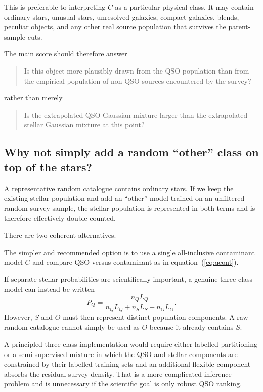 \documentclass[11pt]{article}
\begin{document}
This is preferable to interpreting $C$ as a particular physical class. It may
contain ordinary stars, unusual stars, unresolved galaxies, compact galaxies,
blends, peculiar objects, and any other real source population that survives
the parent-sample cuts.

The main score should therefore answer
%
\begin{quote}
Is this object more plausibly drawn from the QSO population than from the
empirical population of non-QSO sources encountered by the survey?
\end{quote}
%
rather than merely
%
\begin{quote}
Is the extrapolated QSO Gaussian mixture larger than the extrapolated stellar
Gaussian mixture at this point?
\end{quote}

\subsection{Why not simply add a random ``other'' class on top of the stars?}

A representative random catalogue contains ordinary stars. If we keep the
existing stellar population and add an ``other'' model trained on an
unfiltered random survey sample, the stellar population is represented in both
terms and is therefore effectively double-counted.

There are two coherent alternatives.

The simpler and recommended option is to use a single all-inclusive
contaminant model $C$ and compare QSO versus contaminant as in
equation~(\ref{eq:qcont}).

If separate stellar probabilities are scientifically important, a genuine
three-class model can instead be written
%
\begin{equation}
P_Q
=
\frac{
n_Q L_Q
}{
n_Q L_Q+n_S L_S+n_O L_O
}.
\label{eq:threeclass}
\end{equation}
%
However, $S$ and $O$ must then represent distinct population components.
A raw random catalogue cannot simply be used as $O$ because it already
contains $S$.

A principled three-class implementation would require either labelled
partitioning or a semi-supervised mixture in which the QSO and stellar
components are constrained by their labelled training sets and an additional
flexible component absorbs the residual survey density. That is a more
complicated inference problem and is unnecessary if the scientific goal is
only robust QSO ranking.
\end{document}
